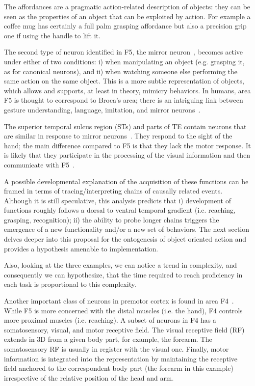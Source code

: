 \ifverbose
%
The affordances are a pragmatic action-related description of objects:
they can be seen as the properties of an object that can be exploited
by action.  For example a coffee mug has certainly a full palm
grasping affordance but also a precision grip one if using the handle
to lift it.
%
\fi

The second type of neuron identified in F5, the mirror neuron~\cite{fadiga00visuomotor}, becomes active under either of two conditions: i)
when manipulating an object (e.g. grasping it, as for canonical neurons), and ii) when watching
someone else performing the same action on the same object. This is a
more subtle representation of objects, which allows and supports, at
least in theory, mimicry behaviors. In humans, area F5 is thought to
correspond to Broca's area; there is an intriguing link between
gesture understanding, language, imitation, and mirror neurons~\cite{rizzolatti98language}.

The superior temporal sulcus region (STs) and parts of TE contain neurons
that are similar in response to mirror neurons~\cite{perret-mistlin-harries-chitty-1990}. 
They respond to the sight of the hand; the main difference compared to F5
is that they lack the motor response. It is likely that they participate in the 
processing of the visual information and then communicate with 
F5~\cite{gallese-fadiga-fogassi-rizzolatti-1996}.

A possible developmental explanation of the acquisition of
these functions can be framed in terms of tracing/interpreting chains 
of causally related events. Although it is still speculative, this analysis 
predicts that i) development of functions roughly follows a dorsal to ventral 
temporal gradient (i.e. reaching, grasping, recognition); ii) the 
ability to probe longer chains triggers the emergence of a new functionality 
and/or a new set of behaviors. 
The next section delves deeper into
this proposal for the ontogenesis of object oriented action and
provides a hypothesis amenable to implementation.

\ifverbose
Also, looking at the three examples, we can notice 
a trend in complexity, and consequently we can hypothesize, that the time 
required to reach proficiency in each task is proportional to this complexity.
\fi

\ifverbose
Another important class of neurons in premotor cortex is found in area
F4~\cite{fogassi96coding}. While F5 is more concerned with the distal
muscles (i.e. the hand), F4 controls more proximal muscles (i.e.
reaching). A subset of neurons in F4 has a somatosensory, visual, and
motor receptive field. The visual receptive field (RF) extends in 3D
from a given body part, for example, the forearm. The somatosensory RF
is usually in register with the visual one. Finally, motor information
is integrated into the representation by maintaining the receptive
field anchored to the correspondent body part (the forearm in this
example) irrespective of the relative position of the head and arm.
\fi
